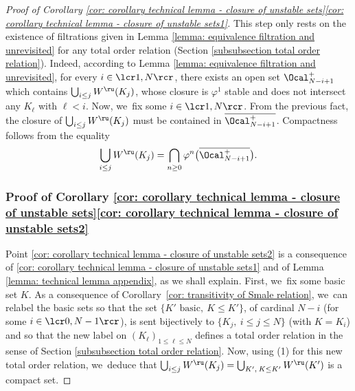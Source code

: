 \begin{appendix}
\begin{proof}[Proof of Corollary \ref{cor: corollary technical lemma - closure of unstable sets}\eqref{cor: corollary technical lemma - closure of unstable sets1}]
This step only rests on the existence of filtrations given in Lemma \ref{lemma: equivalence filtration and unrevisited} for any total order relation (Section \ref{subsubsection total order relation}). Indeed, according to Lemma \ref{lemma: equivalence filtration and unrevisited}, for every $i\in\lcr1,N\rcr$, there exists an open set $\Ocal_{N-i + 1}^+$ which contains $\bigcup_{i \leq j} W^\ru (K_j)$, whose closure is $\varphi^1$ stable and does not intersect any $K_\ell$ with $\ell < i$. Now, we~fix some $i\in\lcr1,N\rcr$. From the previous fact, the closure of $\bigcup_{i \leq j} W^\ru (K_j)$ must be contained in $\overline{\Ocal_{N-i + 1}^+}$. Compactness follows from the equality
\[
\bigcup_{i \leq j} W^\ru (K_j) = \bigcap_{n \geq 0} \varphi^n \bigl(\overline{\Ocal_{N-i+1}^+} \bigr).
\]

\subsubsection*{Proof of Corollary \ref{cor: corollary technical lemma - closure of unstable sets}\eqref{cor: corollary technical lemma - closure of unstable sets2}} Point \eqref{cor: corollary technical lemma - closure of unstable sets2} is a consequence of \eqref{cor: corollary technical lemma - closure of unstable sets1} and of Lemma \ref{lemma: technical lemma appendix}, as we shall explain. First, we~fix some basic set $K$. As a consequence of Corollary~\ref{cor: transitivity of Smale relation}, we~can relabel the basic sets so that the set $\{K' \text{ basic}, \: K \leq K' \}$, of cardinal $N-i$ (for some $i\in\lcr0,N-1\rcr$), is sent bijectively to $\{K_j,\: i \leq j \leq N\}$ (with $K = K_i$) and so that the new label on $(K_\ell)_{1 \leq \ell \leq N}$ defines a total order relation in the sense of Section \ref{subsubsection total order relation}. Now, using (1) for this new total order relation, we~deduce that $\bigcup_{i \leq j} W^\ru (K_j) = \bigcup_{K', \: K \leq K'} W^\ru (K')$ is a compact set.


\end{proof}
\end{appendix}
